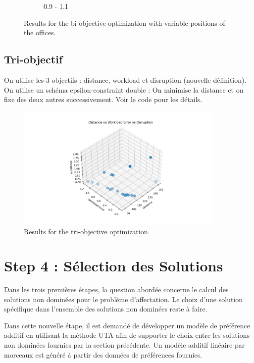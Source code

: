 \documentclass[12pt,a4paper]{article}
\begin{document}
\begin{figure}[H]
\begin{subfigure}{0.32\textwidth}
        \caption{0.9 - 1.1}
        \label{fig:solve3}
    \end{subfigure}
    \caption{Results for the bi-objective optimization with variable positions of the offices.}
    \label{fig:all_solves}
\end{figure}

\subsection*{Tri-objectif}
On utilise les 3 objectifs : distance, workload et disruption (nouvelle définition). On utilise un schéma epsilon-constraint double : On minimise la distance et on fixe des deux autres successivement. Voir le code pour les détails.

\begin{figure}[H]
    \centering
    \includegraphics[width=0.9\textwidth]{figures/solve5.png}
    \caption{Results for the tri-objective optimization.}
    \label{fig:solve2}
\end{figure}


\section*{Step 4 : Sélection des Solutions}

Dans les trois premières étapes, la question abordée concerne le calcul des solutions non dominées pour le problème d'affectation. Le choix d'une solution spécifique dans l'ensemble des solutions non dominées reste à faire. 

Dans cette nouvelle étape, il est demandé de développer un modèle de préférence additif en utilisant la méthode UTA afin de supporter le choix entre les solutions non dominées fournies par la section précédente. Un modèle additif linéaire par morceaux est généré à partir des données de préférences fournies.
\end{document}
